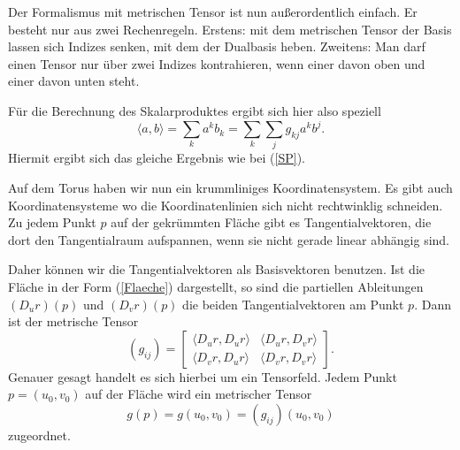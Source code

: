 \documentclass[a4paper,12pt,fleqn]{article}
\begin{document}
Der Formalismus mit metrischen Tensor ist nun außerordentlich
einfach. Er besteht nur aus zwei Rechenregeln. Erstens: mit dem
metrischen Tensor der Basis lassen sich Indizes senken, mit dem
der Dualbasis heben. Zweitens: Man darf einen Tensor nur über zwei
Indizes kontrahieren, wenn einer davon oben und einer davon unten
steht.

Für die Berechnung des Skalarproduktes ergibt sich hier also
speziell
\begin{equation}
\langle a,b\rangle = \sum_k a^k b_k
= \sum_k \sum_j g_{kj} a^k b^j.
\end{equation}
Hiermit ergibt sich das gleiche Ergebnis wie bei (\ref{SP}).

Auf dem Torus haben wir nun ein krummliniges Koordinatensystem.
Es gibt auch Koordinatensysteme wo die Koordinatenlinien sich
nicht rechtwinklig schneiden. Zu jedem Punkt \(p\) auf der gekrümmten
Fläche gibt es Tangentialvektoren, die dort den Tangentialraum
aufspannen, wenn sie nicht gerade linear abhängig sind.

Daher können wir die Tangentialvektoren als Basisvektoren benutzen.
Ist die Fläche in der Form (\ref{Flaeche}) dargestellt, so sind
die partiellen Ableitungen \((D_u r)(p)\) und \((D_v r)(p)\) die
beiden Tangentialvektoren am Punkt \(p\). Dann ist der metrische Tensor
\begin{equation}
(g_{ij}) = \begin{bmatrix}
\langle D_u r,D_u r\rangle & \langle D_u r, D_v r\rangle\\
\langle D_v r,D_u r\rangle & \langle D_v r, D_v r\rangle
\end{bmatrix}.
\end{equation}
Genauer gesagt handelt es sich hierbei um ein Tensorfeld. Jedem
Punkt \(p=(u_0,v_0)\) auf der Fläche wird ein metrischer Tensor
\begin{equation}
g(p) = g(u_0,v_0) = (g_{ij})(u_0,v_0)
\end{equation}
zugeordnet.
\end{document}

